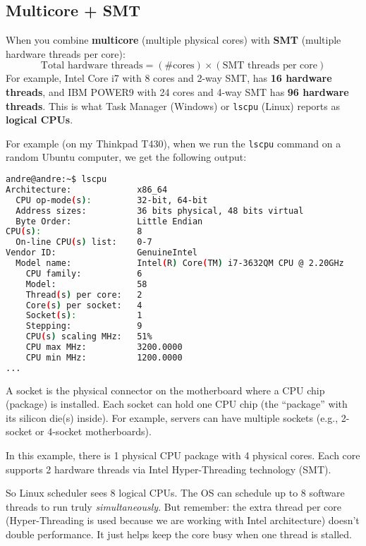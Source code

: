 \subsection{Multicore + SMT}

When you combine \textbf{multicore} (multiple physical cores) with \textbf{SMT} (multiple hardware threads per core):
\begin{equation}
    \text{Total hardware threads} = \left(\text{\# cores}\right) \times \left(\text{SMT threads per core}\right)
\end{equation}
For example, Intel Core i7 with 8 cores and 2-way SMT, has \textbf{16 hardware threads}, and IBM POWER9 with 24 cores and 4-way SMT has \textbf{96 hardware threads}. This is what Task Manager (Windows) or \texttt{lscpu} (Linux) reports as \textbf{logical CPUs}.

\highspace
\begin{examplebox}
    For example (on my Thinkpad T430), when we run the \texttt{lscpu} command on a random Ubuntu computer, we get the following output:
    \begin{lstlisting}[language=bash]
andre@andre:~$ lscpu
Architecture:             x86_64
  CPU op-mode(s):         32-bit, 64-bit
  Address sizes:          36 bits physical, 48 bits virtual
  Byte Order:             Little Endian
CPU(s):                   8
  On-line CPU(s) list:    0-7
Vendor ID:                GenuineIntel
  Model name:             Intel(R) Core(TM) i7-3632QM CPU @ 2.20GHz
    CPU family:           6
    Model:                58
    Thread(s) per core:   2
    Core(s) per socket:   4
    Socket(s):            1
    Stepping:             9
    CPU(s) scaling MHz:   51%
    CPU max MHz:          3200.0000
    CPU min MHz:          1200.0000
...\end{lstlisting}
    A socket is the physical connector on the motherboard where a CPU chip (package) is installed. Each socket can hold one CPU chip (the ``package'' with its silicon die(s) inside). For example, servers can have multiple sockets (e.g., 2-socket or 4-socket motherboards).
    
    \highspace
    In this example, there is 1 physical CPU package with 4 physical cores. Each core supports 2 hardware threads via Intel Hyper-Threading technology (SMT).

    \highspace
    So Linux scheduler sees 8 logical CPUs. The OS can schedule up to 8 software threads to run truly \emph{simultaneously}. But remember: the extra thread per core (Hyper-Threading is used because we are working with Intel architecture) doesn't double performance. It just helps keep the core busy when one thread is stalled.
\end{examplebox}

